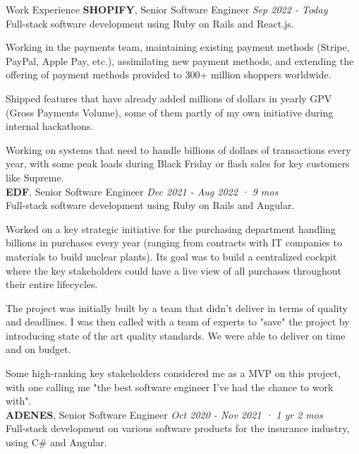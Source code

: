 \documentclass{resume} %
\begin{document}
\begin{rSection}{Work Experience}
{\bf SHOPIFY}{, Senior Software Engineer} \hfill {\em Sep 2022 - Today}\\
Full-stack software development using Ruby on Rails and React.js.

Working in the payments team, maintaining existing payment methods (Stripe, PayPal, Apple Pay, etc.), assimilating new payment methods, and extending the offering of payment methods provided to 300+ million shoppers worldwide.

Shipped features that have already added millions of dollars in yearly GPV (Gross Payments Volume), some of them partly of my own initiative during internal hackathons.

Working on systems that need to handle billions of dollars of transactions every year, with some peak loads during Black Friday or flash sales for key customers like Supreme.\\

{\bf EDF}{, Senior Software Engineer} \hfill {\em Dec 2021 - Aug 2022 · 9 mos}\\
Full-stack software development using Ruby on Rails and Angular.

Worked on a key strategic initiative for the purchasing department handling billions in purchases every year (ranging from contracts with IT companies to materials to build nuclear plants). Its goal was to build a centralized cockpit where the key stakeholders could have a live view of all purchases throughout their entire lifecycles.

The project was initially built by a team that didn't deliver in terms of quality and deadlines. I was then called with a team of experts to "save" the project by introducing state of the art quality standards. We were able to deliver on time and on budget.

Some high-ranking key stakeholders considered me as a MVP on this project, with one calling me "the best software engineer I've had the chance to work with".\\

{\bf ADENES}{, Senior Software Engineer} \hfill {\em Oct 2020 - Nov 2021 · 1 yr 2 mos}\\
Full-stack development on various software products for the insurance industry, using C\# and Angular.


\end{rSection}
\end{document}
